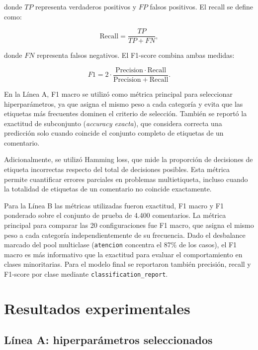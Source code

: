 \documentclass[12pt,a4paper]{article}
\newcommand{\code}[1]{\nolinkurl{#1}}
\begin{document}
donde $TP$ representa verdaderos positivos y $FP$ falsos positivos. El recall se define como:

\begin{equation}
\mathrm{Recall} = \frac{TP}{TP+FN},
\end{equation}

donde $FN$ representa falsos negativos. El F1-score combina ambas medidas:

\begin{equation}
F1 = 2\cdot \frac{\mathrm{Precision}\cdot\mathrm{Recall}}
{\mathrm{Precision}+\mathrm{Recall}}.
\end{equation}

En la Línea A, F1 macro se utilizó como métrica principal para seleccionar hiperparámetros, ya que asigna el mismo peso a cada categoría y evita que las etiquetas más frecuentes dominen el criterio de selección. También se reportó la exactitud de subconjunto (\textit{accuracy exacta}), que considera correcta una predicción solo cuando coincide el conjunto completo de etiquetas de un comentario.

Adicionalmente, se utilizó Hamming loss, que mide la proporción de decisiones de etiqueta incorrectas respecto del total de decisiones posibles. Esta métrica permite cuantificar errores parciales en problemas multietiqueta, incluso cuando la totalidad de etiquetas de un comentario no coincide exactamente.

Para la Línea B las métricas utilizadas fueron exactitud, F1 macro y F1 ponderado sobre el conjunto de prueba de 4.400 comentarios. La métrica principal para comparar las 20 configuraciones fue F1 macro, que asigna el mismo peso a cada categoría independientemente de su frecuencia. Dado el desbalance marcado del pool multiclase (\code{atencion} concentra el 87\% de los casos), el F1 macro es más informativo que la exactitud para evaluar el comportamiento en clases minoritarias. Para el modelo final se reportaron también precisión, recall y F1-score por clase mediante \code{classification\_report}.

\section{Resultados experimentales}

\subsection{Línea A: hiperparámetros seleccionados}
\end{document}
